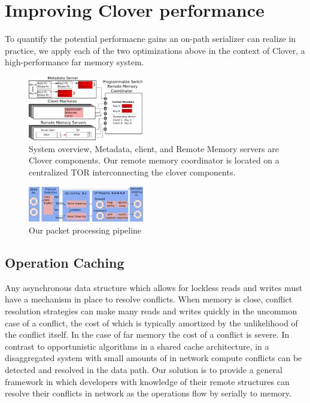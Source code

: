 \section{Improving Clover performance}

To quantify the potential performacne gains an on-path serializer can
realize in practice, we apply each of the two optimizations above in
the context of Clover, a high-performance far memory system.


\begin{figure}
    \includegraphics[width=0.45\textwidth]{fig/overview.pdf}
    \caption{ System overview, Metadata, client, and Remote Memory
    servers are Clover components. Our remote memory coordinator is
    located on a centralized TOR interconnecting the clover components.
    }
    \label{fig:overview} 
\end{figure}

\begin{figure}
    \includegraphics[width=0.45\textwidth]{fig/packet_processing.pdf}
    \caption{Our packet processing pipeline}
    \label{fig:system}
\end{figure}


\subsection{Operation Caching}
\label{sec:operation-caching}

Any asynchronous data structure which allows for lockless reads and writes must
have a mechanism in place to resolve conflicts. When memory is close, conflict
resolution strategies can make many reads and writes quickly in the uncommon
case of a conflict, the cost of which is typically amortized by the unlikelihood
of the conflict itself. In the case of far memory the cost of a conflict is
severe. In contrast to opportunistic algorithms in a shared cache architecture,
in a disaggregated system with small amounts of in network compute conflicts can
be detected and resolved in the data path. Our solution is to provide a general
framework in which developers with knowledge of their remote structures can
resolve their conflicts in network as the operations flow by serially to memory. 


